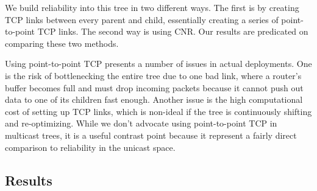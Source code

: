 We build reliability into this tree in two different ways. The first is by creating TCP links between every parent and child, essentially creating a series of point-to-point TCP links. The second way is using CNR. Our results are predicated on comparing these two methods. 

Using point-to-point TCP presents a number of issues in actual deployments. One is the risk of bottlenecking the entire tree due to one bad link, where a router's buffer becomes full and must drop incoming packets because it cannot push out data to one of its children fast enough. Another issue is the high computational cost of setting up TCP links, which is non-ideal if the tree is continuously shifting and re-optimizing. While we don't advocate using point-to-point TCP in multicast trees, it is a useful contrast point because it represent a fairly direct comparison to reliability in the unicast space.

\subsection{Results}